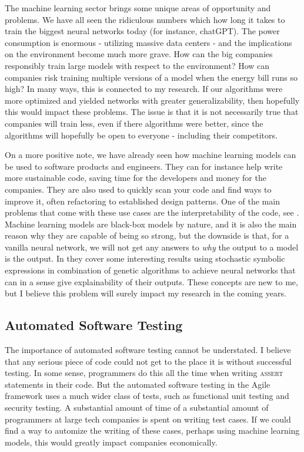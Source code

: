 \documentclass[11pt]{article}
\begin{document}
The machine learning sector brings some unique areas of opportunity and problems. We have all seen the ridiculous numbers which how long it takes to train the biggest neural networks today (for instance, chatGPT). The power consumption is enormous - utilizing massive data centers - and the implications on the environment become much more grave. How can the big companies responsibly train large models with respect to the environment? How can companies risk training multiple versions of a model when the energy bill runs so high? In many ways, this is connected to my research. If our algorithms were more optimized and yielded networks with greater generalizability, then hopefully this would impact these problems. The issue is that it is not necessarily true that companies will train less, even if there algorithms were better, since the algorithms will hopefully be open to everyone - including their competitors. 

On a more positive note, we have already seen how machine learning models can be used to software products and engineers. They can for instance help write more sustainable code, saving time for the developers and money for the companies. They are also used to quickly scan your code and find ways to improve it, often refactoring to established design patterns. One of the main problems that come with these use cases are the interpretability of the code, see \cite{vinuesa2021interpretable}. Machine learning models are black-box models by nature, and it is also the main reason why they are capable of being so strong, but the downside is that, for a vanilla neural network, we will not get any answers to \textit{why} the output to a model is the output. In \cite{vinuesa2021interpretable} they cover some interesting results using stochastic symbolic expressions in combination of genetic algorithms to achieve neural networks that can in a sense give explainability of their outputs. These concepts are new to me, but I believe this problem will surely impact my research in the coming years.   

\subsection*{Automated Software Testing}
The importance of automated software testing cannot be understated. I believe that any serious piece of code could not get to the place it is without successful testing. In some sense, programmers do this all the time when writing \textsc{assert} statements in their code. But the automated software testing in the Agile framework uses a much wider class of tests, such as functional unit testing and security testing. A substantial amount of time of a substantial amount of programmers at large tech companies is spent on writing test cases. If we could find a way to automize the writing of these cases, perhaps using machine learning models, this would greatly impact companies economically. 
\end{document}

